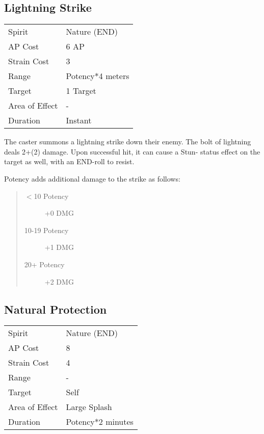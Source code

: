 \documentclass[11pt,a4paper,twocolumn]{book}
\begin{document}
\vfill

\subsection*{Lightning Strike}
{
	\begin{tabu} to 70mm{| X[l,4] | X[l,7] |}
		\hline
		Spirit         & Nature (END)          \\
		AP Cost        & 6 AP                  \\
		Strain Cost    & 3                     \\
		Range          & Potency*4 meters \\
		Target         & 1 Target              \\
		Area of Effect & -                     \\
		Duration       & Instant               \\ \hline
	\end{tabu}
	
}
\medskip

The caster summons a lightning strike down their enemy. The bolt of lightning deals 2+(2) damage. Upon successful hit, it can cause a Stun- status effect on the target as well, with an END-roll to resist.

Potency adds additional damage to the strike as follows:
\begin{quote}
	\begin{description}
		\item[$<$10 Potency] 	+0 DMG
		\item[10-19 Potency] 	+1 DMG
		\item[20+ Potency]  	+2 DMG
	\end{description}	
\end{quote}

\subsection*{Natural Protection}
{
	\begin{tabu} to 70mm{| X[l,4] | X[l,7] |}
		\hline
		Spirit         & Nature (END)      \\
		AP Cost        & 8                 \\
		Strain Cost    & 4                 \\
		Range          & -                 \\
		Target         & Self              \\
		Area of Effect & Large Splash      \\
		Duration       & Potency*2 minutes \\ \hline
	\end{tabu}
	
}
\medskip
\end{document}
